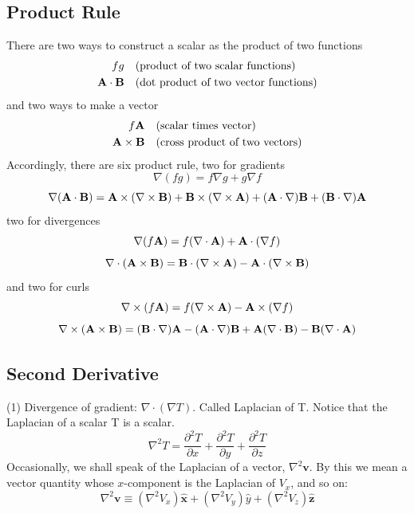 \documentclass[../../../main.tex]{subfiles}
\begin{document}
\subsection{Product Rule}
There are two ways to construct a scalar as the product of two functions
\begin{align*}
    fg\quad         & \text{(product of two scalar functions)}     \\
    \mathbf{A}\cdot \mathbf{B}\quad & \text{(dot product of two vector functions)}
\end{align*}
and two ways to make a vector
\begin{align*}
    f\mathbf{A}\quad         & \text{(scalar times vector)}          \\
    \mathbf{A}\times \mathbf{B}\quad & \text{(cross product of two vectors)}
\end{align*}
Accordingly, there are six product rule, two for gradients
\begin{equation*}
    \nabla ( f g) = f \nabla g + g\nabla f
\end{equation*}
\begin{equation*}
    \nabla(\mathbf{A} \cdot \mathbf{B}) = \mathbf{A} \times (\nabla \times  \mathbf{B}) + \mathbf{B} \times  (\nabla \times  \mathbf{A}) + (\mathbf{A} \cdot \nabla)\mathbf{B} + (\mathbf{B} \cdot \nabla)\mathbf{A}
\end{equation*}
two for divergences
\begin{equation*}
    \nabla ( f \mathbf{A}) = f (\nabla \cdot \mathbf{A}) + \mathbf{A}\cdot(\nabla f)
\end{equation*}
\begin{equation*}
    \nabla\cdot (\mathbf{A} \times \mathbf{B}) = \mathbf{B}\cdot (\nabla \times  \mathbf{A})-\mathbf{A}\cdot (\nabla \times \mathbf{B})
\end{equation*}
and two for curls
\begin{equation*}
    \nabla \times ( f \mathbf{A}) = f (\nabla \times \mathbf{A}) - \mathbf{A} \times (\nabla f )
\end{equation*}
\begin{equation*}
    \nabla \times (\mathbf{A} \times \mathbf{B}) = (\mathbf{B} \cdot \nabla)\mathbf{A} - (\mathbf{A} \cdot \nabla)\mathbf{B} + \mathbf{A}(\nabla \cdot \mathbf{B}) - \mathbf{B}(\nabla \cdot \mathbf{A})
\end{equation*}

\subsection{Second Derivative}

(1) Divergence of gradient: $\nabla \cdot (\nabla T)$.
Called Laplacian of T. Notice that the Laplacian of a scalar T is a scalar.
\begin{equation*}
    \nabla^2 T=\frac{\partial^2T}{\partial x}+\frac{\partial^2T}{\partial y}+\frac{\partial^2T}{\partial z}
\end{equation*}
Occasionally, we shall speak of the Laplacian of a vector, $\nabla ^2  \mathbf{v}$. By this we mean a vector quantity whose $x$-component is the Laplacian of $V_x$, and so on:
\begin{equation*}
    \nabla^2 \mathbf{v} \equiv (\nabla^2 V_x ) \mathbf{\hat{x}} + (\nabla^2 V_y)\hat{y} + (\nabla^2 V_z ) \mathbf{\hat{z}}
\end{equation*}
\end{document}
